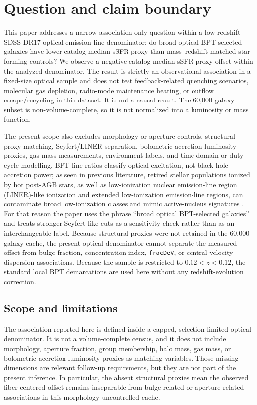 \documentclass[twocolumn]{aastex631}
\begin{document}

\section{Question and claim boundary}
This paper addresses a narrow association-only question within a low-redshift SDSS DR17 optical emission-line denominator: do broad optical BPT-selected galaxies have lower catalog median sSFR proxy than mass--redshift matched star-forming controls? We observe a negative catalog median sSFR-proxy offset within the analyzed denominator. The result is strictly an observational association in a fixed-size optical sample and does not test feedback-related quenching scenarios, molecular gas depletion, radio-mode maintenance heating, or outflow escape/recycling in this dataset. It is not a causal result. The 60,000-galaxy subset is non-volume-complete, so it is not normalized into a luminosity or mass function.


The present scope also excludes morphology or aperture controls, structural-proxy matching, Seyfert/LINER separation, bolometric accretion-luminosity proxies, gas-mass measurements, environment labels, and time-domain or duty-cycle modelling. BPT line ratios classify optical excitation, not black-hole accretion power; as seen in previous literature, retired stellar populations ionized by hot post-AGB stars, as well as low-ionization nuclear emission-line region (LINER)-like ionization and extended low-ionization emission-line regions, can contaminate broad low-ionization classes and mimic active-nucleus signatures \citep{cidfernandes2011,stasinska2008,stasinska2015,belfiore2016}. For that reason the paper uses the phrase ``broad optical BPT-selected galaxies'' and treats stronger Seyfert-like cuts as a sensitivity check rather than as an interchangeable label. Because structural proxies were not retained in the 60,000-galaxy cache, the present optical denominator cannot separate the measured offset from bulge-fraction, concentration-index, \texttt{fracDeV}, or central-velocity-dispersion associations. Because the sample is restricted to $0.02<z<0.12$, the standard local BPT demarcations are used here without any redshift-evolution correction.

\subsection{Scope and limitations}
The association reported here is defined inside a capped, selection-limited optical denominator. It is not a volume-complete census, and it does not include morphology, aperture fraction, group membership, halo mass, gas mass, or bolometric accretion-luminosity proxies as matching variables. Those missing dimensions are relevant follow-up requirements, but they are not part of the present inference. In particular, the absent structural proxies mean the observed fiber-centered offset remains inseparable from bulge-related or aperture-related associations in this morphology-uncontrolled cache.
\end{document}
